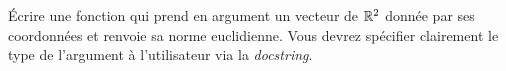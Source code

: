\'Ecrire une fonction  qui prend en argument un vecteur de $\mathbb{R}^2$ donnée par ses coordonnées et renvoie sa norme euclidienne. 
Vous devrez spécifier clairement le type de l'argument à l'utilisateur via la \emph{docstring}.

